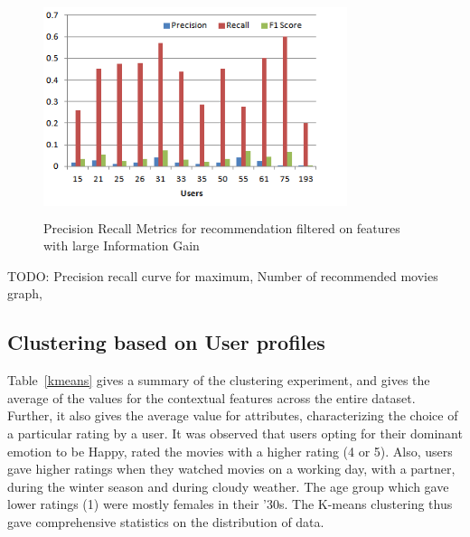 \documentclass{article}
\begin{document}
\begin{figure}[H]
\includegraphics[height=2.5in, width=3.5in]{PrecRecallIG.png}
\caption{Precision Recall Metrics for recommendation filtered on features with large Information Gain}
\label{precrecallig}
\end{figure}

TODO: Precision recall curve for maximum, Number of recommended movies graph, 


\subsection{Clustering based on User profiles}
 Table~\ref{kmeans} gives a summary of the clustering experiment, and gives the average of the values for the contextual features across the entire dataset. Further, it also gives the average value for attributes, characterizing the choice of a particular rating by a user. It was observed that users opting for their dominant emotion to be Happy, rated the movies with a higher rating (4 or 5). Also, users gave higher ratings when they watched movies on a working day, with a partner, during the winter season and during cloudy weather. The age group which gave lower ratings (1) were mostly females in their '30s. The K-means clustering thus gave comprehensive statistics on the distribution of data.
\end{document}
